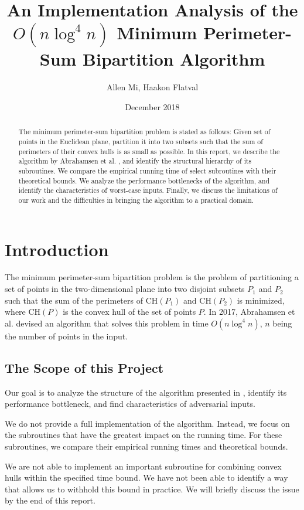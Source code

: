 \documentclass{article}
\title{An Implementation Analysis of the \\ $O(n \log^4 n)$ Minimum Perimeter-Sum Bipartition Algorithm}
\author{Allen Mi, Haakon Flatval}
\date{December 2018}
\begin{document}
\maketitle

\begin{abstract}
    The minimum perimeter-sum bipartition problem is stated as follows: Given set of points in the Euclidean plane, partition it into two subsets such that the sum of perimeters of their convex hulls is as small as possible. In this report, we describe the algorithm by Abrahamsen et al. \cite{abb17}, and identify the structural hierarchy of its subroutines. We compare the empirical running time of select subroutines with their theoretical bounds. We analyze the performance bottlenecks of the algorithm, and identify the characteristics of worst-case inputs. Finally, we discuss the limitations of our work and the difficulties in bringing the algorithm to a practical domain.
\end{abstract}

\section{Introduction}
The minimum perimeter-sum bipartition problem is the problem of partitioning a set of points in the two-dimensional plane into two disjoint subsets $P_1$ and $P_2$ such that the sum of the perimeters of $\text{CH}(P_1)$ and $\text{CH}(P_2)$ is minimized, where $\text{CH}(P)$ is the convex hull of the set of points $P$. In 2017, Abrahamsen et al. \cite{abb17} devised an algorithm that solves this problem in time $O(n \log^4 n)$, $n$ being the number of points in the input.

\subsection{The Scope of this Project}

Our goal is to analyze the structure of the algorithm presented in \cite{abb17}, identify its performance bottleneck, and find characteristics of adversarial inputs.

We do not provide a full implementation of the algorithm. Instead, we focus on the subroutines that have the greatest impact on the running time. For these subroutines, we compare their empirical running times and theoretical bounds.

We are not able to implement an important subroutine for combining convex hulls within the specified time bound. We have not been able to identify a way that allows us to withhold this bound in practice. We will briefly discuss the issue by the end of this report.
\end{document}
